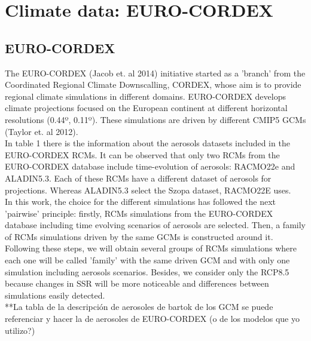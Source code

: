 \section{Climate data: EURO-CORDEX}

\subsection{EURO-CORDEX}

The EURO-CORDEX (Jacob et. al 2014) initiative started as a 'branch' from the Coordinated Regional Climate Downscalling, CORDEX, whose aim is to provide regional climate simulations in different domains. EURO-CORDEX develops climate projections focused on the European continent at different horizontal resolutions (0.44º, 0.11º). These simulations are driven by different CMIP5 GCMs (Taylor et. al 2012).\\

In table 1 there is the information about the aerosols datasets included in the EURO-CORDEX RCMs. It can be observed that only two RCMs from the EURO-CORDEX database include time-evolution of aerosols: RACMO22e and ALADIN5.3. Each of these RCMs have a different dataset of aerosols for projections. Whereas ALADIN5.3 select the Szopa dataset, RACMO22E uses.\\ 

In this work, the choice for the different simulations has followed the next 'pairwise' principle: firstly, RCMs simulations from the EURO-CORDEX database including time evolving scenarios of aerosols are selected. Then, a family of RCMs simulations driven by the same GCMs is constructed around it. Following these steps, we will obtain several groups of RCMs simulations where each one will be called 'family' with the same driven GCM and with only one simulation including aerosols scenarios. Besides, we consider only the RCP8.5 because changes in SSR will be more noticeable and differences between simulations easily detected.\\ 

**La tabla de la descripción de aerosoles de bartok de los GCM se puede referenciar y hacer la de aerosoles de EURO-CORDEX (o de los modelos que yo utilizo?)

